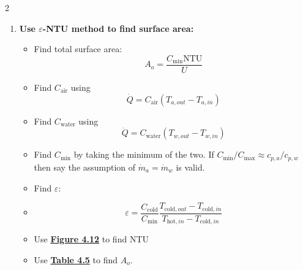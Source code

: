 \begin{multicols*}{2}
\begin{enumerate}
        \item \textbf{Use $\varepsilon$-NTU method to find surface area:}
              \begin{itemize}
                  \item Find total surface area:
                        \[
                            A_o = \frac{C_\text{min} \text{NTU}}{U}
                        \]
                  \item Find $C_\text{air}$ using
                        \[
                            \dot{Q} = C_\text{air} \left(T_{a, out} - T_{a, in}\right)
                        \]
                  \item Find $C_\text{water}$ using
                        \[
                            \dot{Q} = C_\text{water} \left(T_{w, out} - T_{w, in}\right)
                        \]
                  \item Find $C_\text{min}$ by taking the minimum of the two. If $C_\text{min} / C_\text{max}  \approx c_{p, a} / c_{p, w}$ then say the assumption of $\dot{m}_a = \dot{m}_w$ is valid.
                  \item Find $\varepsilon$:
                  \item \[
                            \varepsilon = \frac{C_{\text{cold}}}{C_{\text{min}}} \frac{T_{\text{cold}, out} - T_{\text{cold}, in}}{T_{\text{hot}, in} - T_{\text{cold}, in}}
                        \]
                  \item Use \underline{\textbf{Figure 4.12}} to find NTU
                  \item Use \underline{\textbf{Table 4.5}} to find $A_o$.
              \end{itemize}



\end{enumerate}
\end{multicols*}
